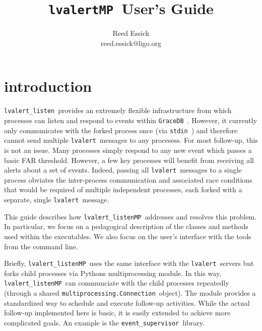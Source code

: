 \documentclass{article}
\newcommand{\stdin}{\texttt{stdin}~}
\newcommand{\multiprocessingConnection}{\texttt{multiprocessing.Connection}~}
\newcommand{\GraceDB}{\texttt{GraceDB}~}
\newcommand{\alert}{\texttt{lvalert}~}
\newcommand{\lvalertListen}{\texttt{lvalert\_listen}~}
\newcommand{\lvalertMP}{\texttt{lvalertMP}~}
\newcommand{\lvalertListenMP}{\texttt{lvalert\_listenMP}~}
\newcommand{\eventSupervisor}{\texttt{event\_supervisor}~}
\begin{document}

\title{
\lvalertMP User's Guide
}

\author{
Reed Essick \\
reed.essick@ligo.org
}

\maketitle

\newpage


\tableofcontents
\listoffigures

\newpage


\section{introduction}

\lvalertListen provides an extremely flexible infrastructure from which processes can listen and respond to events within \GraceDB. 
However, it currently only communicates with the forked process once (via \stdin) and therefore cannot send multiple \alert messages to any procesess.
For most follow-up, this is not an issue.
Many processes simply respond to any new event which passes a basic FAR threshold. 
However, a few key processes will benefit from receiving all alerts about a set of events.
Indeed, passing all \alert messages to a single process obviates the inter-process communication and associated race conditions that would be required of multiple independent processes, each forked with a separate, single \alert message.

This guide describes how \lvalertListenMP addresses and resolves this problem. 
In particular, we focus on a pedagogical description of the classes and methods used within the executables.
We also focus on the user's interface with the tools from the command line.

Briefly, \lvalertListenMP uses the same interface with the \alert servers but forks child processes via Pythons multiprocessing module.
In this way, \lvalertListenMP can communciate with the child processes repeatedly (through a shared \multiprocessingConnection object).
The module provides a standardized way to schedule and execute follow-up activities.
While the actual follow-up implemented here is basic, it is easily extended to achieve more complicated goals.
An example is the \eventSupervisor library.
\end{document}
